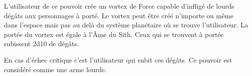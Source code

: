 \begin{description}[align=left]
        L’utilisateur de ce pouvoir crée un vortex de Force capable d’infligé de lourds dégâts aux personnages à porté. Le vortex peut être créé n’importe ou même dans l’espace mais pas au delà du système planétaire où se trouve l’utilisateur. La portée du vortex est égale à l’\^Ame du Sith. Ceux qui se trouvent à portée subissent 2d10 de dégâts.

        En cas d’échec critique c’est l’utilisateur qui subit ces dégâts. Ce pouvoir est considéré comme une arme lourde.
        \\

\end{description}